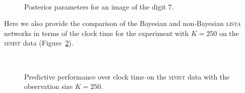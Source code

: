 \documentclass{article}
\begin{document}
\begin{figure}[h]
\centering
{}~
~
\caption{Posterior parameters for an image of the digit 7.}
\label{fig:posterior_distribution}
\end{figure}

Here we also provide the comparison of the Bayesian and non-Bayesian \textsc{lista} networks in terms of the clock time for the experiment with $K = 250$ on the \textsc{mnist} data (Figure~\ref{fig:mnist_time}).

\begin{figure}[h]
\centering
{}~
~
\caption{Predictive performance over clock time on the \textsc{mnist} data with the observation size $K = 250$.}
\label{fig:mnist_time}
\end{figure}


%
%
\end{document}
